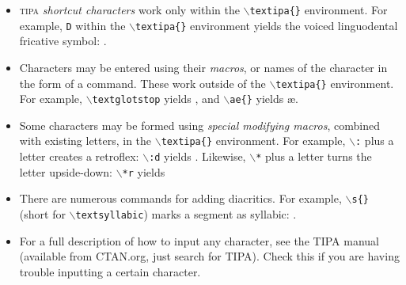 \documentclass{article}
\begin{document}
\begin{itemize}
	\item{ \textsc{tipa} \emph{shortcut characters} work only within the \texttt{$\backslash$textipa\{\}} environment. For example, \texttt{D} within the \texttt{$\backslash$textipa\{\}} environment yields the voiced linguodental fricative symbol: . }
	\item{ Characters may be entered using their \emph{macros}, or names of the character in the form of a command. These work outside of the \texttt{$\backslash$textipa\{\}} environment. For example, \texttt{$\backslash$textglotstop} yields \textglotstop, and \texttt{$\backslash$ae\{\}} yields \ae{}. }
	\item{ Some characters may be formed using \emph{special modifying macros}, combined with existing letters, in the \texttt{$\backslash$textipa\{\}} environment. For example, \texttt{$\backslash$:} plus a
	letter creates a retroflex: \texttt{$\backslash$:d} yields	. Likewise, \texttt{$\backslash$*} plus a letter turns the letter upside-down: \texttt{$\backslash$*r} yields  }
	\item{ There are numerous commands for adding diacritics. For example, \texttt{$\backslash$s\{\}} (short for \texttt{$\backslash$textsyllabic}) marks a segment
	as syllabic: . }
	\item{ For a full description of how to input any character, see the TIPA manual (available from CTAN.org, just search for TIPA). Check this if you are having 
	trouble inputting a certain character. }
\end{itemize}
\end{document}
